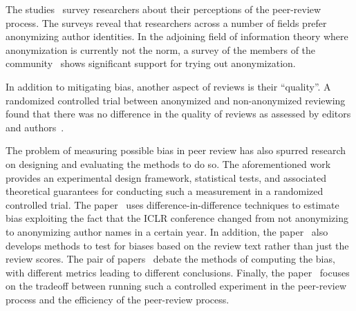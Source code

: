 \documentclass{article}
\newcommand{\rev}[1]{{\color{black}#1}}
\begin{document}
The studies~\cite{ware2008peer,mulligan2013peer} survey researchers about their perceptions of the peer-review process. The surveys reveal that researchers across a number of fields prefer anonymizing author identities. In the adjoining field of information theory where anonymization is currently not the norm, a survey of the members of the community~\cite{shah2021itsocsurvey} shows significant support for trying out anonymization.

\rev{In addition to mitigating bias, another aspect of reviews is their ``quality''. A randomized controlled trial between anonymized and non-anonymized reviewing found that there was no difference in the quality of reviews as assessed by editors and authors~\cite{justice1998does}.}

The problem of measuring possible bias in peer review has also spurred research on designing and evaluating the methods to do so. The aforementioned work~\cite{stelmakh2019testing} provides an experimental design framework, statistical tests, and associated theoretical guarantees for conducting such a measurement in a randomized controlled trial. The paper~\cite{manzoor2020uncovering} uses difference-in-difference techniques to estimate bias exploiting the fact that the ICLR conference changed from not anonymizing to anonymizing author names in a certain year. In addition, the paper~\cite{manzoor2020uncovering} also develops methods to test for biases based on the review text rather than just the review scores. The pair of papers~\cite{madden2006impact,snodgrass2006single} debate the methods of computing the bias, with different metrics leading to different conclusions. Finally, the paper~\cite{jecmen2021split} focuses on the tradeoff between running such a controlled experiment in the peer-review process and the efficiency of the peer-review process. 
\end{document}
